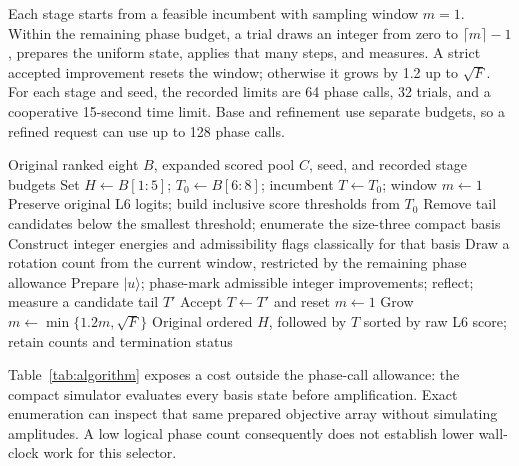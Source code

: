 Each stage starts from a feasible incumbent with sampling window $m=1$. Within the remaining phase budget, a trial draws an integer from zero to $\lceil m\rceil-1$, prepares the uniform state, applies that many steps, and measures. A strict accepted improvement resets the window; otherwise it grows by 1.2 up to $\sqrt F$. For each stage and seed, the recorded limits are 64 phase calls, 32 trials, and a cooperative 15-second time limit. Base and refinement use separate budgets, so a refined request can use up to 128 phase calls.

\begin{table}[t]
\centering\small
\caption{Refinement controller in implementation order. Integer marking and true-redundancy acceptance have different roles; neither uses test judgments.}
\label{tab:algorithm}
\begin{minipage}{.96\textwidth}
\begin{algorithmic}[1]
\REQUIRE Original ranked eight $B$, expanded scored pool $C$, seed, and recorded stage budgets
\STATE Set $H\gets B[1{:}5]$; $T_0\gets B[6{:}8]$; incumbent $T\gets T_0$; window $m\gets1$
\STATE Preserve original L6 logits; build inclusive score thresholds from $T_0$
\STATE Remove tail candidates below the smallest threshold; enumerate the size-three compact basis
\STATE Construct integer energies and admissibility flags classically for that basis
\STATE Draw a rotation count from the current window, restricted by the remaining phase allowance
\STATE Prepare $|u\rangle$; phase-mark admissible integer improvements; reflect; measure a candidate tail $T'$
\STATE Accept $T\gets T'$ and reset $m\gets1$
\ELSE
\STATE Grow $m\gets\min\{1.2m,\sqrt F\}$
\ENDIF
\ENDWHILE
\RETURN Original ordered $H$, followed by $T$ sorted by raw L6 score; retain counts and termination status
\end{algorithmic}
\end{minipage}
\end{table}

Table~\ref{tab:algorithm} exposes a cost outside the phase-call allowance: the compact simulator evaluates every basis state before amplification. Exact enumeration can inspect that same prepared objective array without simulating amplitudes. A low logical phase count consequently does not establish lower wall-clock work for this selector.
